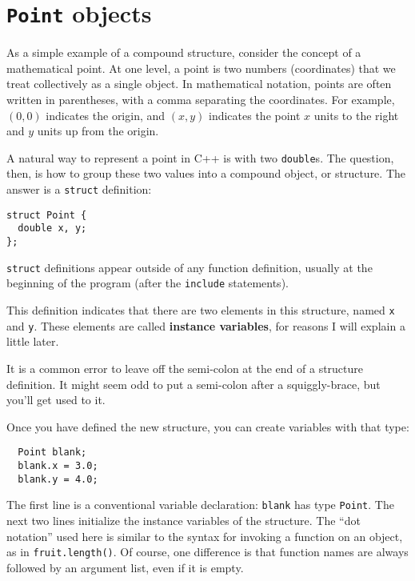 \section{{\tt Point} objects}

As a simple example of a compound structure, consider the concept of a
mathematical point.  At one level, a point is two numbers
(coordinates) that we treat collectively as a single object.  In
mathematical notation, points are often written in parentheses, with a
comma separating the coordinates.  For example, $(0, 0)$ indicates the
origin, and $(x, y)$ indicates the point $x$ units to the right and
$y$ units up from the origin.

A natural way to represent a point in C++ is with two {\tt double}s.
The question, then, is how to group these two values into
a compound object, or structure.  The answer is a {\tt struct}
definition:

\begin{verbatim}
struct Point {
  double x, y;
};  
\end{verbatim}
%
{\tt struct} definitions appear outside of any function definition,
usually at the beginning of the program (after the {\tt include}
statements).

This definition indicates that there are two elements in this
structure, named {\tt x} and {\tt y}.  These elements are called
{\bf instance variables}, for reasons I will explain a little
later.

It is a common error to leave off the semi-colon at the end of a
structure definition.  It might seem odd to put a semi-colon after a
squiggly-brace, but you'll get used to it.

Once you have defined the new structure, you can create variables
with that type:

\begin{verbatim}
  Point blank;
  blank.x = 3.0;
  blank.y = 4.0;   
\end{verbatim}
%
The first line is a conventional variable declaration: {\tt blank} has
type {\tt Point}.  The next two lines initialize the instance variables of the
structure.  The ``dot notation'' used here is similar to the syntax
for invoking a function on an object, as in {\tt fruit.length()}.
Of course, one difference is that function names are always followed
by an argument list, even if it is empty.


